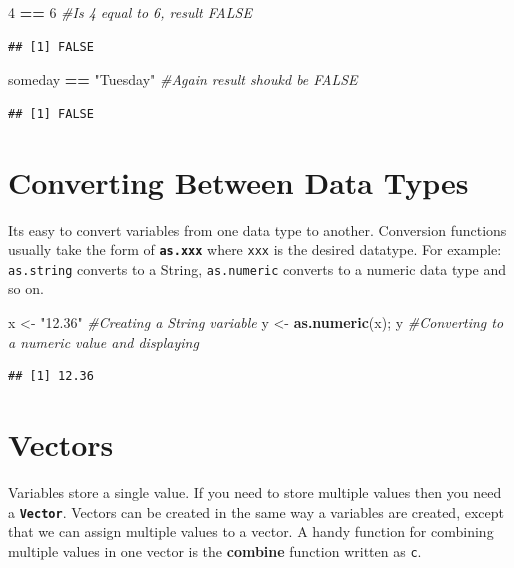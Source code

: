 \documentclass[]{krantz}
\makeatletter
\newenvironment{Shaded}{\begin{snugshade}}{\end{snugshade}}
\newcommand{\KeywordTok}[1]{\textcolor[rgb]{0.27,0.27,0.27}{\textbf{#1}}}
\newcommand{\DecValTok}[1]{\textcolor[rgb]{0.06,0.06,0.06}{#1}}
\newcommand{\StringTok}[1]{\textcolor[rgb]{0.5,0.5,0.5}{#1}}
\newcommand{\CommentTok}[1]{\textcolor[rgb]{0.56,0.35,0.01}{\textit{#1}}}
\newcommand{\OperatorTok}[1]{\textcolor[rgb]{0.81,0.36,0.00}{\textbf{#1}}}
\newcommand{\NormalTok}[1]{#1}
\newenvironment{kframe}{%
\medskip{}
\setlength{\fboxsep}{.8em}
 \def\at@end@of@kframe{}%
 \ifinner\ifhmode%
  \def\at@end@of@kframe{\end{minipage}}%
  \begin{minipage}{\columnwidth}%
 \fi\fi%
 \def\FrameCommand##1{\hskip\@totalleftmargin \hskip-\fboxsep
 \colorbox{shadecolor}{##1}\hskip-\fboxsep
     \hskip-\linewidth \hskip-\@totalleftmargin \hskip\columnwidth}%
 \MakeFramed {\advance\hsize-\width
   \@totalleftmargin\z@ \linewidth\hsize
   \@setminipage}}%
 {\par\unskip\endMakeFramed%
 \at@end@of@kframe}
\renewenvironment{Shaded}{\begin{kframe}}{\end{kframe}}
\theoremstyle{definition}
\theoremstyle{definition}
\theoremstyle{definition}
\theoremstyle{remark}
\makeatother
\begin{document}
\begin{Shaded}
\begin{Highlighting}[]
\DecValTok{4} \OperatorTok{==}\StringTok{ }\DecValTok{6} \CommentTok{#Is 4 equal to 6, result FALSE}
\end{Highlighting}
\end{Shaded}

\begin{verbatim}
## [1] FALSE
\end{verbatim}

\begin{Shaded}
\begin{Highlighting}[]
\NormalTok{someday }\OperatorTok{==}\StringTok{ "Tuesday"} \CommentTok{#Again result shoukd be FALSE}
\end{Highlighting}
\end{Shaded}

\begin{verbatim}
## [1] FALSE
\end{verbatim}

\section{Converting Between Data
Types}\label{converting-between-data-types}

Its easy to convert variables from one data type to another. Conversion
functions usually take the form of \textbf{\texttt{as.xxx}} where
\texttt{xxx} is the desired datatype. For example: \texttt{as.string}
converts to a String, \texttt{as.numeric} converts to a numeric data
type and so on.

\begin{Shaded}
\begin{Highlighting}[]
\NormalTok{x <-}\StringTok{ "12.36"} \CommentTok{#Creating a String variable}
\NormalTok{y <-}\StringTok{ }\KeywordTok{as.numeric}\NormalTok{(x); y }\CommentTok{#Converting to a numeric value and displaying}
\end{Highlighting}
\end{Shaded}

\begin{verbatim}
## [1] 12.36
\end{verbatim}

\section{Vectors}\label{vectors}

Variables store a single value. If you need to store multiple values
then you need a \textbf{\texttt{Vector}}. Vectors can be created in the
same way a variables are created, except that we can assign multiple
values to a vector. A handy function for combining multiple values in
one vector is the \textbf{combine} function written as \texttt{c}.
\end{document}
